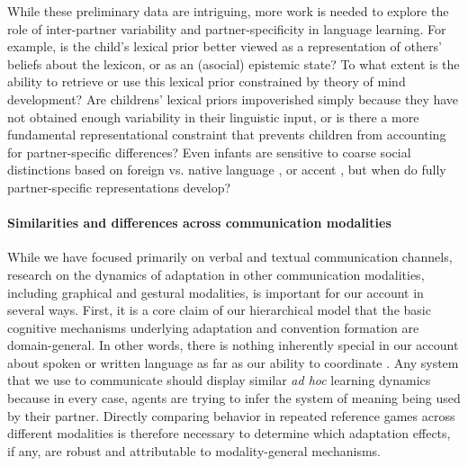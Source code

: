 While these preliminary data are intriguing, more work is needed to explore the role of inter-partner variability and partner-specificity in language learning. 
For example, is the child's lexical prior better viewed as a representation of others' beliefs about the lexicon, or as an (asocial) epistemic state? 
To what extent is the ability to retrieve or use this lexical prior constrained by theory of mind development? 
Are childrens' lexical priors impoverished simply because they have not obtained enough variability in their linguistic input, or is there a more fundamental representational constraint that prevents children from accounting for partner-specific differences? 
Even infants are sensitive to coarse social distinctions based on foreign vs. native language \cite{KinzlerDupouxSpelke07_LanguageGroups}, or accent \cite{KinzlerEtAl09_AccentRace}, but when do fully partner-specific representations develop?

\paragraph{Similarities and differences across communication modalities}


While we have focused primarily on verbal and textual communication channels, research on the dynamics of adaptation in other communication modalities, including graphical \cite{GarrodFayLeeOberlanderMacLeod07_GraphicalSymbolSystems,TheisenEtAl10_SystematicityArbitrariness,hawkins2019disentangling} and gestural \cite{FayListerEllisonGoldinMeadow13_GestureBeatsVocalization,bohn2019young} modalities, is important for our account in several ways.
First, it is a core claim of our hierarchical model that the basic cognitive mechanisms underlying adaptation and convention formation are domain-general.
In other words, there is nothing inherently special in our account about spoken or written language as far as our ability to coordinate . 
Any system that we use to communicate should display similar \emph{ad hoc} learning dynamics because in every case, agents are trying to infer the system of meaning being used by their partner.
Directly comparing behavior in repeated reference games across different modalities is therefore necessary to determine which adaptation effects, if any, are robust and attributable to modality-general mechanisms.

